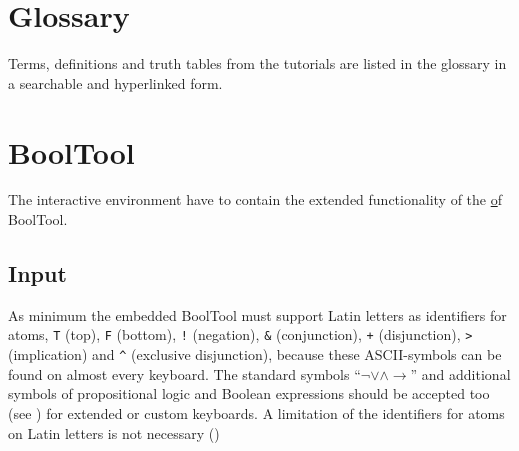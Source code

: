 %
%


\section{Glossary}

Terms, definitions and truth tables from the tutorials are listed in the glossary in a searchable and hyperlinked form.

\section{BoolTool}

The interactive environment have to contain the extended functionality of the \href{web fronted} of BoolTool.

\subsection{Input}

As minimum the embedded BoolTool must support Latin letters as identifiers for atoms, 
\verb#T# (top), 
\verb#F# (bottom),
\verb#!# (negation), 
\verb#&# (conjunction),
\verb#+# (disjunction),
\verb#># (implication) and 
\verb#^# (exclusive disjunction), because these ASCII-symbols can be found on almost every keyboard.
The standard symbols “$ \neg \vee \wedge \rightarrow $” and additional symbols of propositional logic and Boolean expressions
 should be accepted too (see ) for extended or custom keyboards.
A limitation of the identifiers for atoms on Latin letters is not necessary ()

